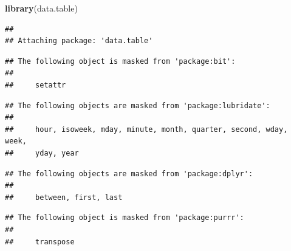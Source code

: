 \documentclass[
]{article}
\newenvironment{Shaded}{\begin{snugshade}}{\end{snugshade}}
\newcommand{\FunctionTok}[1]{\textcolor[rgb]{0.13,0.29,0.53}{\textbf{#1}}}
\newcommand{\NormalTok}[1]{#1}
\begin{document}
\begin{Shaded}
\begin{Highlighting}[]
\FunctionTok{library}\NormalTok{(data.table)}
\end{Highlighting}
\end{Shaded}

\begin{verbatim}
## 
## Attaching package: 'data.table'
\end{verbatim}

\begin{verbatim}
## The following object is masked from 'package:bit':
## 
##     setattr
\end{verbatim}

\begin{verbatim}
## The following objects are masked from 'package:lubridate':
## 
##     hour, isoweek, mday, minute, month, quarter, second, wday, week,
##     yday, year
\end{verbatim}

\begin{verbatim}
## The following objects are masked from 'package:dplyr':
## 
##     between, first, last
\end{verbatim}

\begin{verbatim}
## The following object is masked from 'package:purrr':
## 
##     transpose
\end{verbatim}
\end{document}
